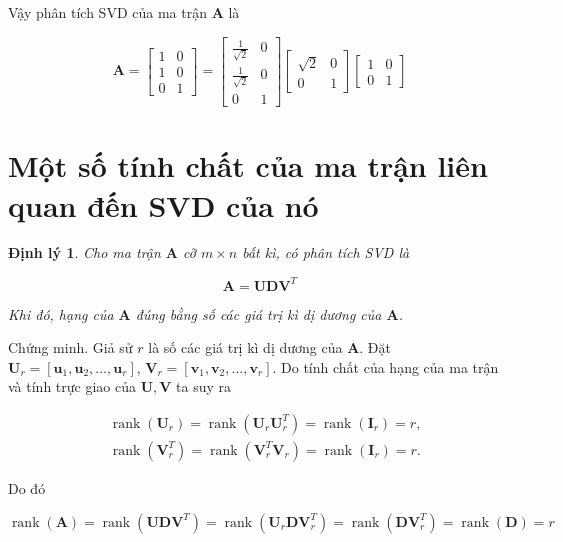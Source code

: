 \documentclass[12pt,a4paper,oneside]{report}
\newtheorem{dl}{Định lý}[section]
\numberwithin{equation}{section}
\begin{document}
Vậy phân tích SVD của ma trận $\mathbf{A}$ là

$$
\mathbf{A}=\left[\begin{array}{ll}
	1 & 0 \\
	1 & 0 \\
	0 & 1
\end{array}\right]=\left[\begin{array}{cc}
	\frac{1}{\sqrt{2}} & 0 \\
	\frac{1}{\sqrt{2}} & 0 \\
	0 & 1
\end{array}\right]\left[\begin{array}{cc}
	\sqrt{2} & 0 \\
	0 & 1
\end{array}\right]\left[\begin{array}{ll}
	1 & 0 \\
	0 & 1
\end{array}\right]
$$

\section{Một số tính chất của ma trận liên quan đến SVD của nó}
\begin{dl}
Cho ma trận $\mathbf{A}$ cỡ $m \times n$ bất kì, có phân tích SVD là

$$
\mathbf{A}=\mathbf{U D V}^{T}
$$

Khi đó, hạng của $\mathbf{A}$ đúng bằng số các giá trị kì dị dương của $\mathbf{A}$.
\end{dl}
Chứng minh. Giả sử $r$ là số các giá trị kì dị dương của $\mathbf{A}$. Đặt $\mathbf{U}_{r}=\left[\mathbf{u}_{1}, \mathbf{u}_{2}, \ldots, \mathbf{u}_{r}\right]$, $\mathbf{V}_{r}=\left[\mathbf{v}_{1}, \mathbf{v}_{2}, \ldots, \mathbf{v}_{r}\right]$. Do tính chất của hạng của ma trận và tính trực giao của $\mathbf{U}, \mathbf{V}$ ta suy ra

$$
\begin{aligned}
	& \operatorname{rank}\left(\mathbf{U}_{r}\right)=\operatorname{rank}\left(\mathbf{U}_{r} \mathbf{U}_{r}^{T}\right)=\operatorname{rank}\left(\mathbf{I}_{r}\right)=r, \\
	& \operatorname{rank}\left(\mathbf{V}_{r}^{T}\right)=\operatorname{rank}\left(\mathbf{V}_{r}^{T} \mathbf{V}_{r}\right)=\operatorname{rank}\left(\mathbf{I}_{r}\right)=r .
\end{aligned}
$$

Do đó

$$
\operatorname{rank}(\mathbf{A})=\operatorname{rank}\left(\mathbf{U D V}^{T}\right)=\operatorname{rank}\left(\mathbf{U}_{r} \mathbf{D} \mathbf{V}_{r}^{T}\right)=\operatorname{rank}\left(\mathbf{D V}_{r}^{T}\right)=\operatorname{rank}(\mathbf{D})=r
$$
\end{document}
